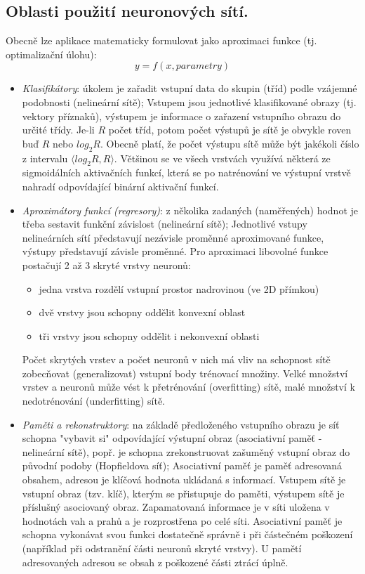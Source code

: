 \subsection{Oblasti použití neuronových sítí.}
Obecně lze aplikace matematicky formulovat jako aproximaci funkce (tj. optimalizační úlohu):
\begin{equation}
y = f(x, parametry)
\end{equation}
\begin{itemize}
\item \textit{Klasifikátory}: úkolem je zařadit vstupní data do skupin (tříd) podle vzájemné podobnosti (nelineární sítě); Vstupem jsou jednotlivé klasifikované obrazy (tj. vektory příznaků), výstupem je informace o zařazení vstupního obrazu do určité třídy. Je-li $ R $ počet tříd, potom počet výstupů je sítě je obvykle roven buď $ R $ nebo $ log_2R $. Obecně platí, že počet výstupu sítě může být jakékoli číslo z intervalu $ \langle log_2R, R\rangle$. Většinou se ve všech vrstvách využívá některá ze sigmoidálních aktivačních funkcí, která se po natrénování ve výstupní vrstvě nahradí odpovídající binární aktivační funkcí.
\item \textit{Aproximátory funkcí (regresory)}: z několika zadaných (naměřených) hodnot je třeba sestavit funkční závislost (nelineární sítě); Jednotlivé vstupy nelineárních sítí představují nezávisle proměnné aproximované funkce, výstupy představují závisle proměnné. Pro aproximaci libovolné funkce postačují 2 až 3 skryté vrstvy neuronů:
\begin{itemize}
\item jedna vrstva rozdělí vstupní prostor nadrovinou (ve 2D přímkou)
\item dvě vrstvy jsou schopny oddělit konvexní oblast
\item tři vrstvy jsou schopny oddělit i nekonvexní oblasti
\end{itemize}
Počet skrytých vrstev a počet neuronů v nich má vliv na schopnost sítě zobecňovat (generalizovat) vstupní body trénovací množiny. Velké množství vrstev a neuronů může vést k přetrénování (overfitting) sítě, malé množství k nedotrénování (underfitting) sítě.
\item \textit{Paměti a rekonstruktory}: na základě předloženého vstupního obrazu je síť schopna "vybavit si" odpovídající výstupní obraz (asociativní paměť - nelineární sítě), popř. je schopna zrekonstruovat zašuměný vstupní obraz do původní podoby (Hopfieldova síť); Asociativní paměť je paměť adresovaná obsahem, adresou je klíčová hodnota ukládaná s informací. Vstupem sítě je vstupní obraz (tzv. klíč), kterým se přistupuje do paměti, výstupem sítě je příslušný asociovaný obraz. Zapamatovaná informace je v síti uložena v hodnotách vah a prahů a je rozprostřena po celé síti. Asociativní paměť je schopna vykonávat svou funkci dostatečně správně i při částečném poškození (například při odstranění části neuronů skryté vrstvy). U pamětí adresovaných adresou se obsah z poškozené části ztrácí úplně.

\end{itemize}
